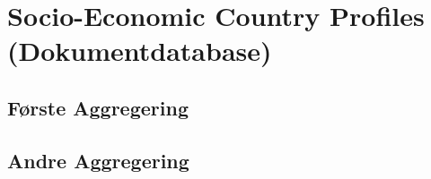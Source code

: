 \section{Socio-Economic Country Profiles (Dokumentdatabase)}
\subsection{Første Aggregering}

\subsection{Andre Aggregering}
